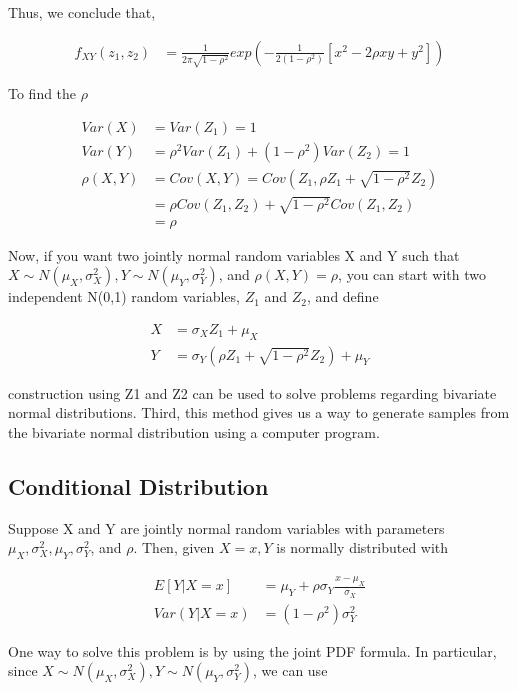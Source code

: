 \documentclass[11pt]{article} %
\begin{document}
Thus, we conclude that,

\begin{align*}
	f_{XY}(z_1, z_2) &= \frac{1}{2 \pi \sqrt{1-\rho^2}} exp \left( -\frac{1}{2 (1- \rho^2)} [x^2 -2 \rho xy + y^2] \right)
\end{align*}


To find the $\rho$

\begin{align*}
	Var(X) &= Var(Z_1) =1 \\
	Var(Y) &= \rho^2 Var(Z_1) + (1- \rho^2) Var(Z_2) = 1 \\
	\rho(X,Y) &= Cov(X, Y) = Cov(Z_1, \rho Z_1 + \sqrt{1-\rho^2} Z_2) \\
	&= \rho Cov(Z_1, Z_2) + \sqrt{1-\rho^2} Cov(Z_1, Z_2) \\
	&= \rho
\end{align*}

Now, if you want two jointly normal random variables X and Y such that $X \sim N(\mu_X, \sigma^2_X), Y \sim N(\mu_Y, \sigma^2_Y)$, and $\rho(X,Y)= \rho$, you can start with two independent N(0,1) random variables, $Z_1$ and $Z_2$, and define

\begin{align*}
	X &= \sigma_X Z_1 + \mu_X \\
	Y &= \sigma_Y \left(\rho Z_1 + \sqrt{1-\rho^2} Z_2 \right)  + \mu_Y
\end{align*}

construction using Z1 and Z2 can be used to solve problems regarding bivariate normal distributions. Third, this method gives us a way to generate samples from the bivariate normal distribution using a computer program. 

\subsection{Conditional Distribution}

Suppose X and Y are jointly normal random variables with parameters $\mu_X, \sigma^2_X, \mu_Y, \sigma^2_Y$, and $ \rho $. Then, given $X=x, Y$ is normally distributed with

\begin{align*}
	E[Y|X=x] &= \mu_Y + \rho \sigma_Y \frac{x-\mu_X}{\sigma_X} \\
	Var(Y|X=x) &= (1- \rho^2) \sigma^2_Y
\end{align*}

One way to solve this problem is by using the joint PDF formula. In particular, since $X \sim N(\mu_X, \sigma^2_X), Y \sim N(\mu_Y, \sigma^2_Y)$, we can use
\end{document}
